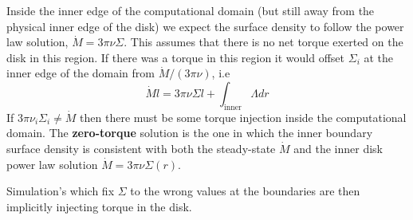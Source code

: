 \documentclass{article}
\begin{document}
Inside the inner edge of the computational domain (but still away from the physical inner edge of the disk) we expect the surface density to follow the power law solution, $\dot{M} = 3\pi \nu \Sigma$. This assumes that there is no net torque exerted on the disk in this region. If there was a torque in this region it would offset $\Sigma_i$ at the inner edge of the domain from $\dot{M}/(3 \pi \nu)$, i.e
\begin{equation}
\dot{M} l = 3 \pi \nu \Sigma l + \int_\text{inner} \Lambda dr 
\end{equation}
If $3 \pi \nu_i \Sigma_i \neq \dot{M}$ then there must be some torque injection inside the computational domain. The \textbf{zero-torque} solution is the one in which the inner boundary surface density is consistent with both the steady-state $\dot{M}$ and the inner disk power law solution $ \dot{M} = 3 \pi \nu \Sigma(r)$. 

Simulation's which fix $\Sigma$ to the wrong values at the boundaries are then implicitly injecting torque in the disk. 
\end{document}
